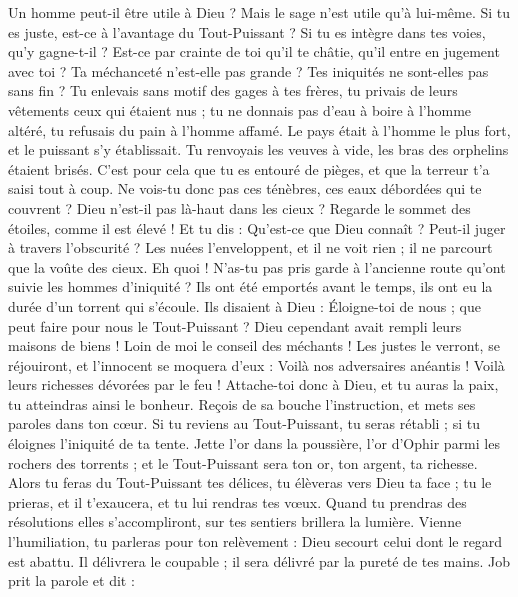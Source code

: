\begin{multicols}{2}
Un homme peut-il être utile à Dieu ? Mais le sage n'est utile qu'à lui-même.
Si tu es juste, est-ce à l'avantage du Tout-Puissant ? Si tu es intègre dans tes voies, qu'y gagne-t-il ?
Est-ce par crainte de toi qu'il te châtie, qu'il entre en jugement avec toi ?
Ta méchanceté n'est-elle pas grande ? Tes iniquités ne sont-elles pas sans fin ?
Tu enlevais sans motif des gages à tes frères, tu privais de leurs vêtements ceux qui étaient nus ;
tu ne donnais pas d'eau à boire à l'homme altéré, tu refusais du pain à l'homme affamé.
Le pays était à l'homme le plus fort, et le puissant s'y établissait.
Tu renvoyais les veuves à vide, les bras des orphelins étaient brisés.
C'est pour cela que tu es entouré de pièges, et que la terreur t'a saisi tout à coup.
Ne vois-tu donc pas ces ténèbres, ces eaux débordées qui te couvrent ?
Dieu n'est-il pas là-haut dans les cieux ? Regarde le sommet des étoiles, comme il est élevé !
Et tu dis : Qu'est-ce que Dieu connaît ? Peut-il juger à travers l'obscurité ?
Les nuées l'enveloppent, et il ne voit rien ; il ne parcourt que la voûte des cieux.
Eh quoi ! N'as-tu pas pris garde à l'ancienne route qu'ont suivie les hommes d'iniquité ?
Ils ont été emportés avant le temps, ils ont eu la durée d'un torrent qui s'écoule.
Ils disaient à Dieu : Éloigne-toi de nous ; que peut faire pour nous le Tout-Puissant ?
Dieu cependant avait rempli leurs maisons de biens ! Loin de moi le conseil des méchants !
Les justes le verront, se réjouiront, et l'innocent se moquera d'eux :
Voilà nos adversaires anéantis ! Voilà leurs richesses dévorées par le feu !
Attache-toi donc à Dieu, et tu auras la paix, tu atteindras ainsi le bonheur.
Reçois de sa bouche l'instruction, et mets ses paroles dans ton cœur.
Si tu reviens au Tout-Puissant, tu seras rétabli ; si tu éloignes l'iniquité de ta tente.
Jette l'or dans la poussière, l'or d'Ophir parmi les rochers des torrents ;
et le Tout-Puissant sera ton or, ton argent, ta richesse.
Alors tu feras du Tout-Puissant tes délices, tu élèveras vers Dieu ta face ;
tu le prieras, et il t'exaucera, et tu lui rendras tes vœux.
Quand tu prendras des résolutions elles s'accompliront, sur tes sentiers brillera la lumière.
Vienne l'humiliation, tu parleras pour ton relèvement : Dieu secourt celui dont le regard est abattu.
Il délivrera le coupable ; il sera délivré par la pureté de tes mains.
\VerseOne{}Job prit la parole et dit :

\end{multicols}
